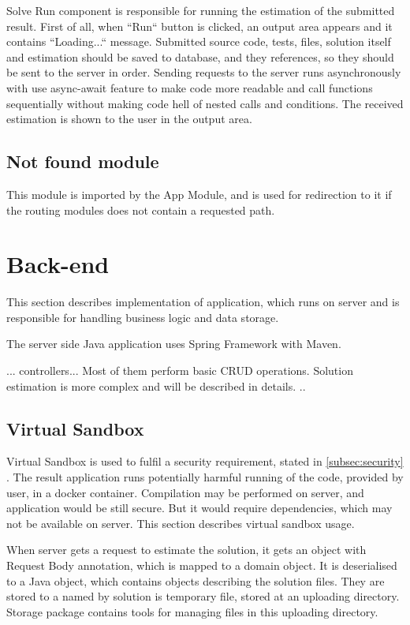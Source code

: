 Solve Run component is responsible for running the estimation of the submitted result. First of all, when ``Run`` button is clicked, an output area appears and it contains ``Loading...`` message. Submitted source code, tests, files, solution itself and estimation should be saved to database, and they references, so they should be sent to the server in order. Sending requests to the server runs asynchronously with use async-await feature to make code more readable and call functions sequentially without making code hell of nested calls and conditions. The received estimation is shown to the user in the output area.

\subsection{Not found module}
This module is imported by the App Module, and is used for redirection to it if the routing modules does not contain a requested path.


\section{Back-end}
This section describes implementation of application, which runs on server and is responsible for handling business logic and data storage.

The server side Java application uses Spring Framework with Maven.

... controllers... Most of them perform basic CRUD operations. Solution estimation is more complex and will be described in details. ..


\subsection{Virtual Sandbox}
Virtual Sandbox is used to fulfil a security requirement, stated in \ref{subsec:security} . The result application runs potentially harmful running of the code, provided by user, in a docker container. Compilation may be performed on server, and application would be still secure. But it would require dependencies, which may not be available on server. This section describes virtual sandbox usage.

When server gets a request to estimate the solution, it gets an object with Request Body annotation, which is mapped to a domain object. It is deserialised to a Java object, which contains objects describing the solution files. They are stored to a named by solution is temporary file, stored at an uploading directory. Storage package contains tools for managing files in this uploading directory.

